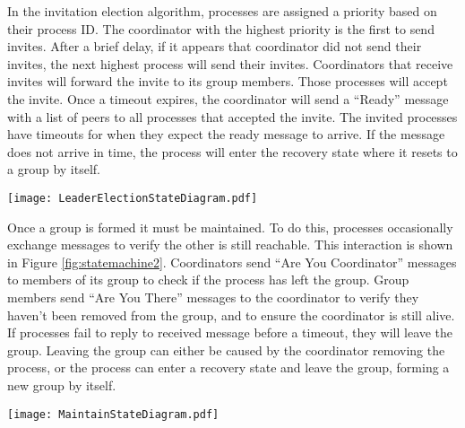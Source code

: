 In the invitation election algorithm, processes are assigned a priority based on their process ID.
The coordinator with the highest priority is the first to send invites.
After a brief delay, if it appears that coordinator did not send their invites, the next highest process will send their invites.
Coordinators that receive invites will forward the invite to its group members.
Those processes will accept the invite.
Once a timeout expires, the coordinator will send a ``Ready'' message with a list of peers to all processes that accepted the invite.
The invited processes have timeouts for when they expect the ready message to arrive.
If the message does not arrive in time, the process will enter the recovery state where it resets to a group by itself.

\begin{figure*}[!t]
\texttt{[image: LeaderElectionStateDiagram.pdf]}
\caption{State machine of a leader election. Processes start as coordinators in the ``Normal'' state and search for other coordinators to join with. Processes immediately respond to ``Are You Coordinator'' (AYC) messages they receive. The algorithm was modified by adding a ``Ready Acknowledgment'' message as the final step of completing the election. Additionally, processes only accept invites if they have received an ``AYC Response'' message from the inviting process.}
\label{fig:statemachine}
\end{figure*}

Once a group is formed it must be maintained.
To do this, processes occasionally exchange messages to verify the other is still reachable.
This interaction is shown in Figure \ref{fig:statemachine2}.
Coordinators send ``Are You Coordinator'' messages to members of its group to check if the process has left the group.
Group members send ``Are You There'' messages to the coordinator to verify they haven't been removed from the group, and to ensure the coordinator is still alive.
If processes fail to reply to received message before a timeout, they will leave the group.
Leaving the group can either be caused by the coordinator removing the process, or the process can enter a recovery state and leave the group, forming a new group by itself.

\begin{figure*}[!t]
\texttt{[image: MaintainStateDiagram.pdf]}
\caption{State machine of maintaining a group. The ``Are You Coordinator'' (AYC) messages are the same as those in Figure \ref{fig:statemachine}. AYC and ``Are You There'' (AYT) are periodically sent by processes, and responses to those messages are immediately sent by the receiving process. In the modified algorithm, the member does not enter the recovery state if they do not receive an AYT response before the timeout expires.}
\label{fig:statemachine2}
\end{figure*}

